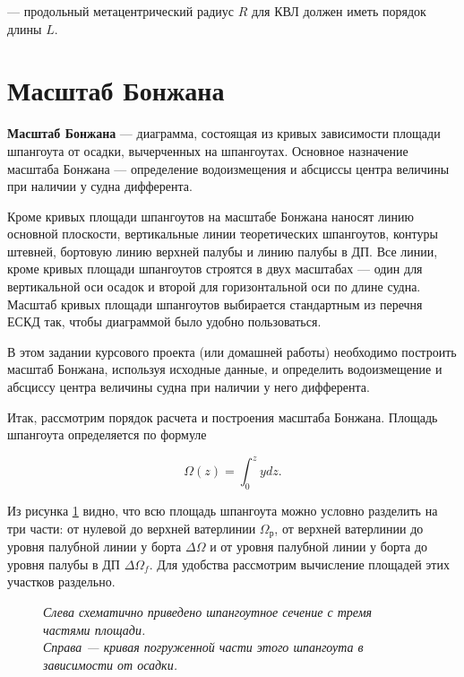 --- продольный метацентрический радиус $R$ для КВЛ должен иметь порядок длины $L$.

\section{Масштаб Бонжана}

\textbf{Масштаб Бонжана} --- диаграмма, состоящая из кривых зависимости площади шпангоута от осадки, вычерченных на шпангоутах.
Основное назначение масштаба Бонжана --- определение водоизмещения и абсциссы центра величины при наличии у судна дифферента.

Кроме кривых площади шпангоутов на масштабе Бонжана наносят линию основной плоскости, вертикальные линии теоретических шпангоутов, контуры штевней, бортовую линию верхней палубы и линию палубы в ДП.
Все линии, кроме кривых площади шпангоутов строятся в двух масштабах --- один для вертикальной оси осадок и второй для горизонтальной оси по длине судна.
Масштаб кривых площади шпангоутов выбирается стандартным из перечня ЕСКД так, чтобы диаграммой было удобно пользоваться.

В этом задании курсового проекта (или домашней работы) необходимо построить масштаб Бонжана, используя исходные данные, и определить водоизмещение и абсциссу центра величины судна при наличии у него дифферента.

Итак, рассмотрим порядок расчета и построения масштаба Бонжана.
Площадь шпангоута определяется по формуле

\begin{equation}
    \Omega(z) = \int_0^z y dz.
\end{equation}

Из рисунка \ref{fig:station-area-1} видно, что всю площадь шпангоута можно условно разделить на три части: от нулевой до верхней ватерлинии $\Omega_{\text{р}}$, от верхней ватерлинии до уровня палубной линии у борта $\Delta \Omega$ и от уровня палубной линии у борта до уровня палубы в ДП $\Delta \Omega_f$.
Для удобства рассмотрим вычисление площадей этих участков раздельно.

\begin{figure}[h!]
    \centerline{}
    \caption{К расчету площади шпангоута}
    \caption*{\textit{
        Слева схематично приведено шпангоутное сечение с тремя частями площади.\\
        Справа --- кривая погруженной части этого шпангоута в зависимости от осадки.
    }}
    \label{fig:station-area-1}
\end{figure}

